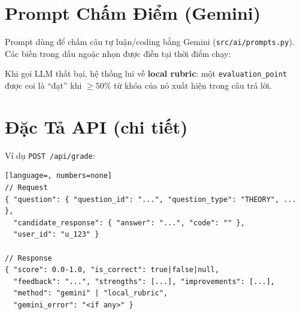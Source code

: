 \documentclass[12pt, a4paper]{report}
\begin{document}
\section{Prompt Chấm Điểm (Gemini)}
\label{apx:prompt}

Prompt dùng để chấm câu tự luận/coding bằng Gemini (\texttt{src/ai/prompts.py}). Các biến trong dấu ngoặc nhọn được điền tại thời điểm chạy:

\begin{center}
\end{center}

Khi gọi LLM thất bại, hệ thống lui về \textbf{local rubric}: một \texttt{evaluation\_point} được coi là ``đạt'' khi $\geq 50\%$ từ khóa của nó xuất hiện trong câu trả lời.

\section{Đặc Tả API (chi tiết)}
\label{apx:api}

Ví dụ \texttt{POST /api/grade}:
\begin{lstlisting}[language=, numbers=none]
// Request
{ "question": { "question_id": "...", "question_type": "THEORY", ... },
  "candidate_response": { "answer": "...", "code": "" },
  "user_id": "u_123" }

// Response
{ "score": 0.0-1.0, "is_correct": true|false|null,
  "feedback": "...", "strengths": [...], "improvements": [...],
  "method": "gemini" | "local_rubric",
  "gemini_error": "<if any>" }
\end{lstlisting}
\end{document}
